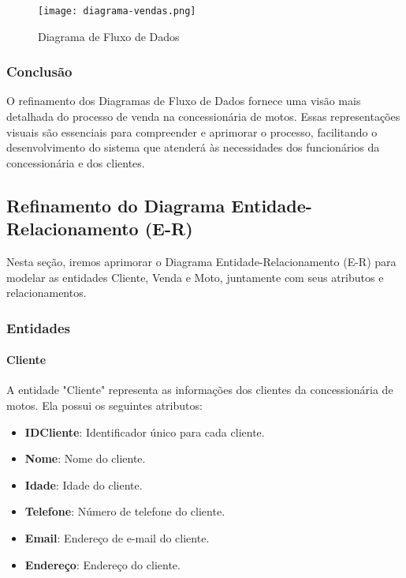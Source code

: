 \begin{figure}[h]
	\centering
	\texttt{[image: diagrama-vendas.png]}
	\caption{Diagrama de Fluxo de Dados}
	\label{fig:Diagrama de Fluxo de Dados}
\end{figure}

\subsubsection{Conclusão}

O refinamento dos Diagramas de Fluxo de Dados fornece uma visão mais detalhada do processo de venda na concessionária de motos. Essas representações visuais são essenciais para compreender e aprimorar o processo, facilitando o desenvolvimento do sistema que atenderá às necessidades dos funcionários da concessionária e dos clientes.

\subsection{Refinamento do Diagrama Entidade-Relacionamento (E-R)}

Nesta seção, iremos aprimorar o Diagrama Entidade-Relacionamento (E-R) para modelar as entidades Cliente, Venda e Moto, juntamente com seus atributos e relacionamentos.



\subsubsection{Entidades}

\paragraph{Cliente}

A entidade "Cliente" representa as informações dos clientes da concessionária de motos. Ela possui os seguintes atributos:

\begin{itemize}
	\item \textbf{IDCliente}: Identificador único para cada cliente.
	\item \textbf{Nome}: Nome do cliente.
	\item \textbf{Idade}: Idade do cliente.
	\item \textbf{Telefone}: Número de telefone do cliente.
	\item \textbf{Email}: Endereço de e-mail do cliente.
	\item \textbf{Endereço}: Endereço do cliente.
\end{itemize}

